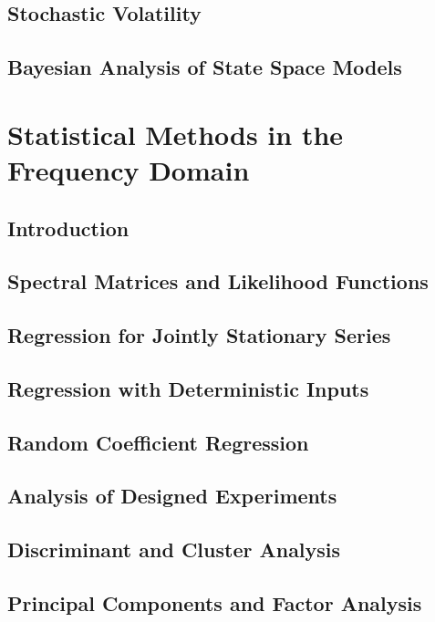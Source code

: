 \documentclass[12pt]{article}
\begin{document}
\subsection{Stochastic Volatility}

\subsection{Bayesian Analysis of State Space Models}


\section{Statistical Methods in the Frequency Domain}
\subsection{Introduction}

\subsection{Spectral Matrices and Likelihood Functions}

\subsection{Regression for Jointly Stationary Series}

\subsection{Regression with Deterministic Inputs}

\subsection{Random Coefficient Regression}

\subsection{Analysis of Designed Experiments}

\subsection{Discriminant and Cluster Analysis}

\subsection{Principal Components and Factor Analysis}
\end{document}
